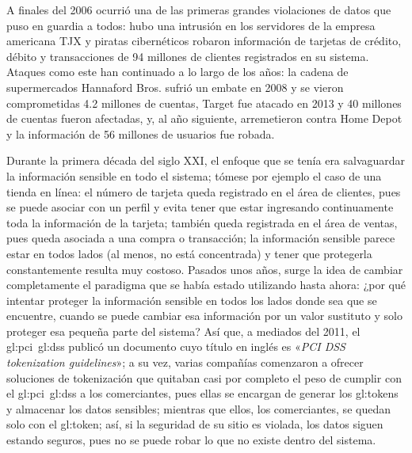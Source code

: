 A finales del 2006 ocurrió una de las primeras grandes violaciones de datos
que puso en guardia a todos: hubo una intrusión en los servidores de la empresa
americana TJX y piratas cibernéticos robaron información de tarjetas de crédito,
débito y transacciones de 94 millones de clientes registrados en su sistema.
Ataques como este han continuado a lo largo de los años: la cadena
de supermercados Hannaford Bros. sufrió un embate en 2008 y se vieron
comprometidas 4.2 millones de cuentas, Target fue atacado en 2013 y 40 millones
de cuentas fueron afectadas, y, al año siguiente, arremetieron contra Home Depot
y la información de 56 millones de usuarios fue robada.

Durante la primera década del siglo XXI, el enfoque que se tenía era
salvaguardar la información sensible en todo el sistema; tómese por ejemplo el
caso de una tienda en línea: el número de tarjeta queda registrado
en el área de clientes, pues se puede asociar con un perfil y evita tener que
estar ingresando continuamente toda la información de la tarjeta; también queda
registrada en el área de ventas, pues queda asociada a una compra o transacción;
la información sensible parece estar en todos lados (al menos, no está
concentrada) y tener que protegerla constantemente resulta muy costoso. Pasados
unos años, surge la idea de cambiar completamente el paradigma que se había
estado utilizando hasta ahora: ¿por qué intentar proteger la información
sensible en todos los lados donde sea que se encuentre, cuando se puede cambiar
esa información por un valor sustituto y solo proteger esa pequeña parte del
sistema? Así que, a mediados del 2011, el \gls{gl:pci}~\gls{gl:dss} publicó
un documento cuyo título en inglés es «\textit{PCI DSS tokenization
guidelines}»; a su vez, varias compañías comenzaron a ofrecer soluciones de
tokenización\footnotemark{} que quitaban casi por completo el peso de cumplir
con el \gls{gl:pci}~\gls{gl:dss} a los comerciantes, pues ellas se encargan de
generar los \glspl{gl:token} y almacenar los datos sensibles; mientras que
ellos, los comerciantes, se quedan solo con el \gls{gl:token}; así, si la
seguridad de su sitio es violada, los datos siguen estando seguros, pues no se
puede robar lo que no existe dentro del sistema.

%
%
%

